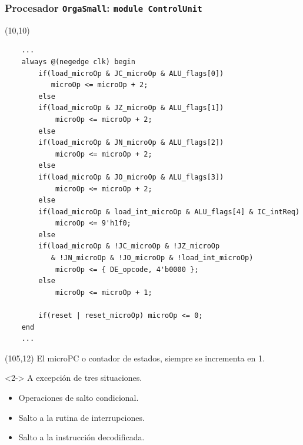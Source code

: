 \documentclass[aspectratio=169]{beamer}
\begin{document}
\begin{frame}[fragile,t]
    \frametitle{Procesador \texttt{OrgaSmall}: \texttt{module ControlUnit}}
    \begin{textblock}{90}(10,10)
\lstset{basicstyle=\tiny}
\begin{lstlisting}
    ...
    always @(negedge clk) begin
        if(load_microOp & JC_microOp & ALU_flags[0])
           microOp <= microOp + 2;
        else
        if(load_microOp & JZ_microOp & ALU_flags[1])
            microOp <= microOp + 2;
        else
        if(load_microOp & JN_microOp & ALU_flags[2])
            microOp <= microOp + 2;
        else
        if(load_microOp & JO_microOp & ALU_flags[3])
            microOp <= microOp + 2;
        else
        if(load_microOp & load_int_microOp & ALU_flags[4] & IC_intReq)
            microOp <= 9'h1f0;
        else
        if(load_microOp & !JC_microOp & !JZ_microOp 
           & !JN_microOp & !JO_microOp & !load_int_microOp)
            microOp <= { DE_opcode, 4'b0000 };
        else
            microOp <= microOp + 1;
            
        if(reset | reset_microOp) microOp <= 0;
    end
    ...
\end{lstlisting}
    \end{textblock}
    \begin{textblock}{47}(105,12)
    \small
    El microPC o contador de estados, siempre se incrementa en 1.\\
    \bigskip
    \begin{onlyenv}<2->
    A excepción de tres situaciones.\\
    \begin{itemize}
     \item Operaciones de salto condicional.
     \item Salto a la rutina de interrupciones.
     \item Salto a la instrucción decodificada.
    \end{itemize}
    \end{onlyenv}
    \end{textblock}
\end{frame}
\end{document}
